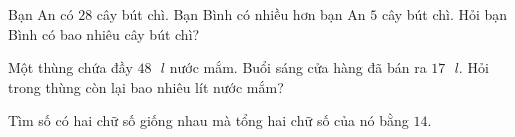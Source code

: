 \begin{bt}[1,5 điểm]
Bạn An có $28$ cây bút chì. Bạn Bình có nhiều hơn bạn An $5$ cây bút chì. Hỏi bạn Bình có bao nhiêu cây bút chì?
\end{bt}

\begin{bt}[1,0 điểm]
Một thùng chứa đầy $48\text{ }l$ nước mắm. Buổi sáng cửa hàng đã bán ra $17\text{ }l$. Hỏi trong thùng còn lại bao nhiêu lít nước mắm?
\end{bt}

\begin{bt}[1,0 điểm]
Tìm số có hai chữ số giống nhau mà tổng hai chữ số của nó bằng $14$.
\end{bt}
